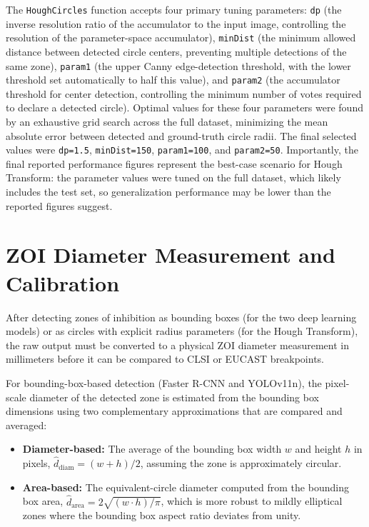 The \texttt{HoughCircles} function accepts four primary tuning parameters: \texttt{dp}
(the inverse resolution ratio of the accumulator to the input image, controlling the
resolution of the parameter-space accumulator), \texttt{minDist} (the minimum allowed
distance between detected circle centers, preventing multiple detections of the same zone),
\texttt{param1} (the upper Canny edge-detection threshold, with the lower threshold set
automatically to half this value), and \texttt{param2} (the accumulator threshold for
center detection, controlling the minimum number of votes required to declare a detected
circle). Optimal values for these four parameters were found by an exhaustive grid search
across the full dataset, minimizing the mean absolute error between detected and ground-truth
circle radii. The final selected values were \texttt{dp=1.5}, \texttt{minDist=150},
\texttt{param1=100}, and \texttt{param2=50}. Importantly, the final reported performance
figures represent the best-case scenario for Hough Transform: the parameter values were
tuned on the full dataset, which likely includes the test set, so generalization performance
may be lower than the reported figures suggest.

\section{ZOI Diameter Measurement and Calibration}

After detecting zones of inhibition as bounding boxes (for the two deep learning models)
or as circles with explicit radius parameters (for the Hough Transform), the raw output must
be converted to a physical ZOI diameter measurement in millimeters before it can be compared
to CLSI or EUCAST breakpoints.

For bounding-box-based detection (Faster R-CNN and YOLOv11n), the pixel-scale diameter of
the detected zone is estimated from the bounding box dimensions using two complementary
approximations that are compared and averaged:
\begin{itemize}
  \item \textbf{Diameter-based:} The average of the bounding box width $w$ and height $h$
        in pixels, $\hat{d}_{\mathrm{diam}} = (w + h)/2$, assuming the zone is approximately
        circular.
  \item \textbf{Area-based:} The equivalent-circle diameter computed from the bounding box
        area, $\hat{d}_{\mathrm{area}} = 2\sqrt{(w \cdot h)/\pi}$, which is more robust
        to mildly elliptical zones where the bounding box aspect ratio deviates from unity.
\end{itemize}

